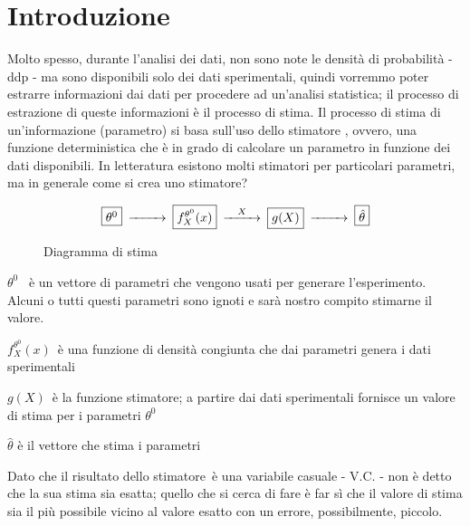 \section{Introduzione}

Molto spesso, durante l'analisi dei dati, non sono note le densità di probabilità - ddp - ma sono disponibili solo dei dati sperimentali, quindi vorremmo poter estrarre informazioni dai dati per procedere ad un'analisi statistica; il processo di estrazione di queste informazioni è il processo di stima. Il processo di stima di un'informazione (parametro) si basa sull'uso dello stimatore , ovvero, una funzione deterministica che è in grado di calcolare un parametro in funzione dei dati disponibili. In letteratura esistono molti stimatori per particolari parametri, ma in generale come si crea uno stimatore?

\begin{figure}[htbp]
  \centering
  \[
    \begin{CD}
      \framebox{$\theta^0$} @>>> \framebox{$f_X^{\theta^0}(x)$} @>X>> \framebox{$g(X)$} @>>> \framebox{$\hat{\theta}$}
    \end{CD}
  \]
  \caption{Diagramma di stima\label{fig:diagrammastima}}
\end{figure}



$\theta^0$  è un vettore di parametri  che vengono usati per generare l'esperimento. Alcuni o tutti questi parametri sono ignoti e sarà nostro compito stimarne il valore. \newline

$f_X^{\theta^0}(x)$ è una funzione di densità congiunta che dai parametri genera i dati sperimentali \newline

$g(X)$ è la funzione stimatore; a partire dai dati sperimentali fornisce un valore di stima per i parametri $\theta^0$ \newline

$\hat{\theta}$ è il vettore che stima i parametri

Dato che il risultato dello stimatore è una variabile casuale - V.C. - non è detto che la sua stima sia esatta; quello che si cerca di fare è far sì che il valore di stima sia il più possibile vicino al valore esatto con un errore, possibilmente, piccolo.

